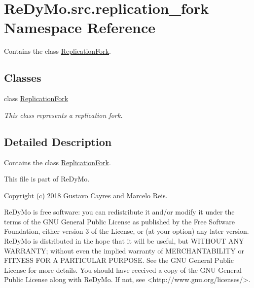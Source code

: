 \hypertarget{namespaceReDyMo_1_1src_1_1replication__fork}{}\section{Re\+Dy\+Mo.\+src.\+replication\+\_\+fork Namespace Reference}
\label{namespaceReDyMo_1_1src_1_1replication__fork}


Contains the class \mbox{\hyperlink{classReDyMo_1_1src_1_1replication__fork_1_1ReplicationFork}{Replication\+Fork}}.  


\subsection*{Classes}
\begin{DoxyCompactItemize}
\item 
class \mbox{\hyperlink{classReDyMo_1_1src_1_1replication__fork_1_1ReplicationFork}{Replication\+Fork}}
\begin{DoxyCompactList}\small\item\em This class represents a replication fork. \end{DoxyCompactList}\end{DoxyCompactItemize}


\subsection{Detailed Description}
Contains the class \mbox{\hyperlink{classReDyMo_1_1src_1_1replication__fork_1_1ReplicationFork}{Replication\+Fork}}. 

\begin{DoxyVerb}This file is part of ReDyMo.

  Copyright (c) 2018  Gustavo Cayres and Marcelo Reis.

  ReDyMo is free software: you can redistribute it and/or modify it
  under the terms of the GNU General Public License as published by the
  Free Software Foundation, either version 3 of the License, or (at your
  option) any later version.
  ReDyMo is distributed in the hope that it will be useful, but WITHOUT
  ANY WARRANTY; without even the implied warranty of MERCHANTABILITY or
  FITNESS FOR A PARTICULAR PURPOSE. See the GNU General Public License
  for more details.
  You should have received a copy of the GNU General Public License along
  with ReDyMo. If not, see <http://www.gnu.org/licenses/>.
\end{DoxyVerb}
